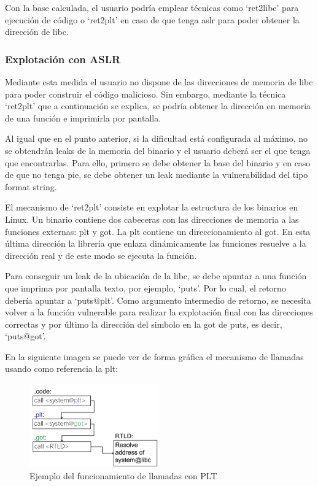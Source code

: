 Con la base calculada, el usuario podría emplear técnicas como `ret2libc' para ejecución de código o `ret2plt' en caso de que tenga \acrshort{aslr} para poder obtener la dirección de \acrshort{libc}.

\subsubsection{Explotación con ASLR}
Mediante esta medida el usuario no dispone de las direcciones de memoria de \acrshort{libc} para poder construir el código malicioso.
Sin embargo, mediante la técnica `ret2plt' que a continuación se explica, se podría obtener la dirección en memoria de una función e imprimirla por pantalla.

Al igual que en el punto anterior, si la dificultad está configurada al máximo, no se obtendrán leaks de la memoria del binario y el usuario deberá ser el que tenga que encontrarlas.
Para ello, primero se debe obtener la base del binario y en caso de que no tenga \acrshort{pie}, se debe obtener un leak mediante la vulnerabilidad del tipo format string.

El mecanismo de `ret2plt' consiste en explotar la estructura de los binarios en Linux.
Un binario contiene dos cabeceras con las direcciones de memoria a las funciones externas: \acrshort{plt} y \acrshort{got}.
La \acrshort{plt} contiene un direccionamiento al \acrshort{got}. En esta última dirección la librería que enlaza dinámicamente las funciones resuelve a la dirección real y de este modo se ejecuta la función.

Para conseguir un leak de la ubicación de la \acrshort{libc}, se debe apuntar a una función que imprima por pantalla texto, por ejemplo, `puts'.
Por lo cual, el retorno debería apuntar a `puts@plt'. Como argumento intermedio de retorno, se necesita volver a la función vulnerable para realizar la explotación final con las direcciones correctas y por último la dirección del simbolo en la \acrshort{got} de puts, es decir, `puts@got'.

En la siguiente imagen se puede ver de forma gráfica el mecanismo de llamadas usando como referencia la \acrshort{plt}:

\FloatBarrier
\begin{figure}[htb!]
    \centering                        
    \includegraphics[width=0.5\textwidth]{images/ret2plt.png}
    \caption{Ejemplo del funcionamiento de llamadas con PLT}
    \label{fig:ret2plt}
\end{figure}
\FloatBarrier

